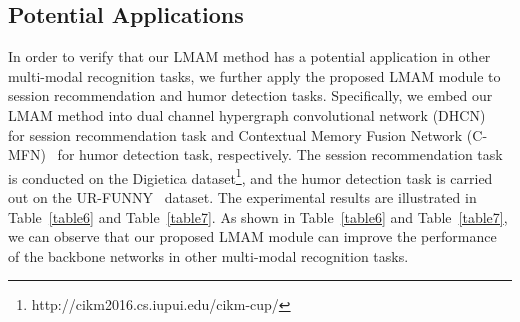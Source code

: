 {{\subsection{Potential Applications}
In order to verify that our LMAM method has a potential application in other multi-modal recognition tasks, we further apply the proposed LMAM module to session recommendation and humor detection tasks. Specifically, we embed our LMAM method into dual channel hypergraph convolutional network (DHCN)~\cite{xia2021self} for session recommendation task and Contextual Memory Fusion Network (C-MFN)~\cite{zadeh2018memory} for humor detection task, respectively. The session recommendation task is conducted on the Digietica dataset\footnote{http://cikm2016.cs.iupui.edu/cikm-cup/}, and the humor detection task is carried out on the UR-FUNNY~\cite{hasan2019ur} dataset. The experimental results are illustrated in Table~\ref{table6} and Table~\ref{table7}. As shown in Table~\ref{table6} and Table~\ref{table7}, we can observe that our proposed LMAM module can improve the performance of the backbone networks in other multi-modal recognition tasks.

\begin{table}[htbp]
	\renewcommand\arraystretch{1.2}
\end{table}

}}
